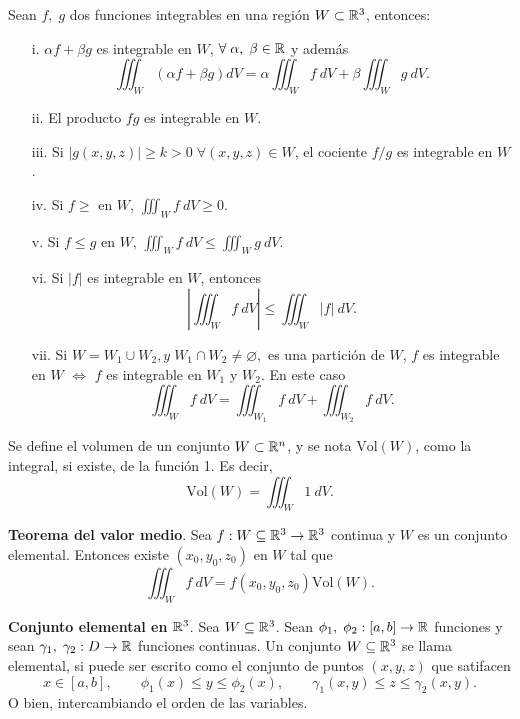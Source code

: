 \begin{propertie}
    Sean $f,\;g$ dos funciones integrables en una regi\'on $W\subset\mathbb{R}^3$, entonces:
    \begin{enumerate}
        \item[i.] $\alpha f+\beta g$ es integrable en $W$, $\forall\;\alpha,\;\beta\in\mathbb{R}$ y adem\'as
        \[
            \iiint_W \left(\alpha f+\beta g\right)dV=\alpha\iiint_W f\:dV+\beta\iiint_W g\:dV.
        \]
        \item[ii.] El producto $fg$ es integrable en $W$.
        \item[iii.] Si $|g(x,y,z)|\geq k>0\;\forall(x,y,z)\in W$, el cociente $f/g$ es integrable en $W$.
        \item[iv.] Si $f\geq$ en $W$, $\iiint_W f\:dV\geq0$.
        \item[v.]Si $f\leq g$ en $W$, $\iiint_W f\:dV\leq\iiint_W g\:dV.$
        \item[vi.]Si $|f|$ es integrable en $W$, entonces 
        \[
            \left|\iiint_W f\:dV\right|\leq\iiint_W|f|\:dV.  
        \]    
        \item[vii.] Si $W=W_1\cup W_2, y \;W_1\cap W_2\neq\varnothing,$ es una partici\'on de $W$, $f$ es integrable en $W$ $\iff$ $f$ es integrable en $W_1$ y $W_2$. En este caso 
        \[
            \iiint_W f\:dV=\iiint_{W_1} f\:dV+\iiint_{W_2}f\:dV.    
        \]
    \end{enumerate}
\end{propertie}

\begin{definition}
    Se define el volumen de un conjunto $W\subset\mathbb{R}^n$, y se nota $\text{Vol}(W)$, como la integral, si existe, de la funci\'on 1. Es decir,
    \[
        \text{Vol}(W)=\iiint_W1\:dV.
    \]
\end{definition}

\begin{theorem}
    \textbf{Teorema del valor medio}. Sea $f:W\subseteq\mathbb{R}^3\to\mathbb{R}^3$ continua y $W$ es un conjunto elemental. Entonces existe $(x_0,y_0,z_0)$ en $W$ tal que 
    \[
        \iiint_W f\:dV=f(x_0,y_0,z_0)\text{Vol}(W).
    \]
\end{theorem}

\begin{definition}
    \textbf{Conjunto elemental en }$\mathbb{R}^3$.
    Sea $W\subseteq\mathbb{R}^3$. Sean $\phi_1,\;\phi_2:[a,b]\to\mathbb{R}$ funciones y sean $\gamma_1,\;\gamma_2:D\to\mathbb{R}$ funciones continuas. Un conjunto $W\subseteq\mathbb{R}^3$ se llama elemental, si puede ser escrito como el conjunto de puntos $(x,y,z)$ que satifacen
    \begin{equation*}
        x\in[a,b], \qquad \phi_1(x)\leq y\leq\phi_2(x), \qquad \gamma_1(x,y)\leq z\leq\gamma_2(x,y). 
    \end{equation*}
    O bien, intercambiando el orden de las variables.
\end{definition}

